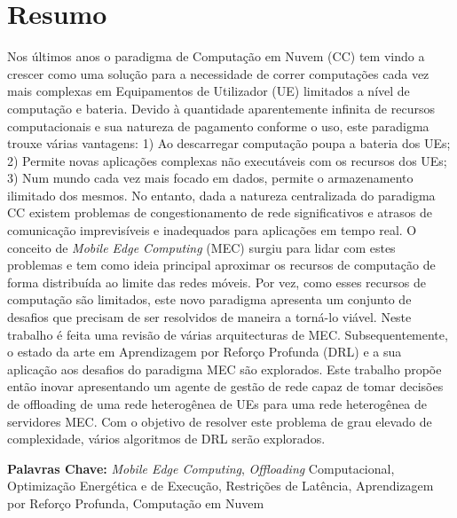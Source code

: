 \section*{Resumo}


\noindent Nos últimos anos o paradigma de Computação em Nuvem (\acrshort{CC}) tem vindo a crescer como uma solução para a necessidade de correr computações cada vez mais complexas em Equipamentos de Utilizador (\acrshort{UE}) limitados a nível de computação e bateria. Devido à quantidade aparentemente infinita de recursos computacionais e sua natureza de pagamento conforme o uso, este paradigma trouxe várias vantagens: 1) Ao descarregar computação poupa a bateria dos UEs; 2) Permite novas aplicações complexas não executáveis com os recursos dos UEs; 3) Num mundo cada vez mais focado em dados, permite o armazenamento ilimitado dos mesmos. No entanto, dada a natureza centralizada do paradigma \acrshort{CC} existem problemas de congestionamento de rede significativos e atrasos de comunicação imprevisíveis e inadequados para aplicações em tempo real. O conceito de \emph{Mobile Edge Computing} (\acrshort{MEC}) surgiu para lidar com estes problemas e tem como ideia principal aproximar os recursos de computação de forma distribuída ao limite das redes móveis. Por vez, como esses recursos de computação são limitados, este novo paradigma apresenta um conjunto de desafios que precisam de ser resolvidos de maneira a torná-lo viável. Neste trabalho é feita uma revisão de várias arquitecturas de \acrshort{MEC}. Subsequentemente, o estado da arte em Aprendizagem por Reforço Profunda (\acrshort{DRL}) e a sua aplicação aos desafios do paradigma \acrshort{MEC} são explorados. Este trabalho propõe então inovar apresentando um agente de gestão de rede capaz de tomar decisões de offloading de uma rede heterogênea de UEs para uma rede heterogênea de servidores \acrshort{MEC}. Com o objetivo de resolver este problema de grau elevado de complexidade, vários algoritmos de \acrshort{DRL} serão explorados.

\vfill

\textbf{\Large Palavras Chave:} \emph{Mobile Edge Computing}, \emph{Offloading} Computacional, Optimização Energética e de Execução, Restrições de Latência, Aprendizagem por Reforço Profunda, Computação em Nuvem

